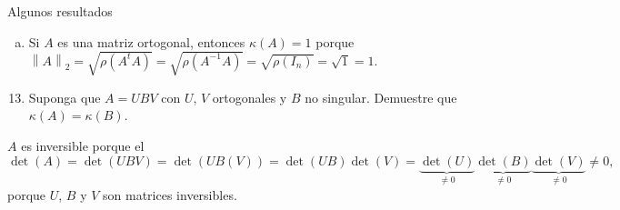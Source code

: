 \documentclass[
	spanish,
	8pt,
	utf8,
	xcolor=table,
	handout,
	aspectratio=169,
	professionalfonts,
	mathserif,
	leqno,
]{beamer}
\begin{document}
\begin{frame}
\begin{alertblock}{Algunos resultados}
\begin{enumerate}[(a)]
			\item

			      Si $A$ es una matriz ortogonal, entonces
			      $\kappa\left(A\right)=1$ porque
			      \begin{math}
				      {\left\|A\right\|}_{2}=
				      \sqrt{\rho\left(A^{t}A\right)}=
				      \sqrt{\rho\left(A^{-1}A\right)}=
				      \sqrt{\rho\left(I_{n}\right)}=
				      \sqrt{1}=1
			      \end{math}.
		\end{enumerate}
	\end{alertblock}
\end{frame}

\begin{frame}

	\begin{enumerate}\setcounter{enumi}{12}
		\item

		      Suponga que $A=UBV$ con $U$, $V$ ortogonales y $B$ no
		      singular.
		      Demuestre que
		      \begin{math}
			      \kappa\left(A\right)=
			      \kappa\left(B\right)
		      \end{math}.

	\end{enumerate}

	\begin{solution}
		$A$ es inversible porque el
		\begin{equation*}
			\det\left(A\right)=
			\det\left(UBV\right)=
			\det\left(UB\left(V\right)\right)=
			\det\left(UB\right)\det\left(V\right)=
			\underbrace{\det\left(U\right)}_{\neq0}
			\underbrace{\det\left(B\right)}_{\neq0}
			\underbrace{\det\left(V\right)}_{\neq0}\neq0,
		\end{equation*}
		porque $U$, $B$ y $V$ son matrices inversibles.


\end{solution}
\end{frame}
\end{document}
